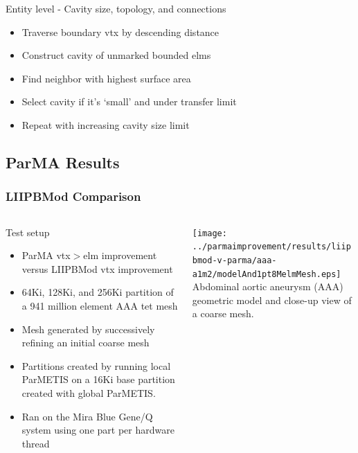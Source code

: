 \documentclass{beamer}
\begin{document}
\begin{frame}
  Entity level - Cavity size, topology, and connections
  \begin{itemize}
    \item Traverse boundary vtx by descending distance
    \item Construct cavity of unmarked bounded elms
    \item Find neighbor with highest surface area
    \item Select cavity if it's `small' and under transfer limit
    \item Repeat with increasing cavity size limit
  \end{itemize}
\end{frame}

\subsection{ParMA Results}

\begin{frame}
  \frametitle{LIIPBMod Comparison}
  \begin{columns} 
    \begin{column}{0.5\textwidth}
      Test setup
      \begin{itemize}
        \item ParMA vtx$>$elm improvement versus LIIPBMod vtx improvement
        \item 64Ki, 128Ki, and 256Ki partition of a 941 million element
          AAA tet mesh
        \item Mesh generated by successively refining an initial coarse mesh
        \item Partitions created by running local ParMETIS on a 16Ki base
          partition created with global ParMETIS.
        \item Ran on the Mira Blue Gene/Q system using one part per hardware
          thread
      \end{itemize}
    \end{column}
    \begin{column}{0.5\textwidth}
      \centering
      \texttt{[image: ../parmaimprovement/results/liipbmod-v-parma/aaa-a1m2/modelAnd1pt8MelmMesh.eps]}\\
      \small
      Abdominal aortic aneurysm (AAA) geometric model and close-up view of a
      coarse mesh.
    \end{column}
  \end{columns}
\end{frame}
\end{document}
